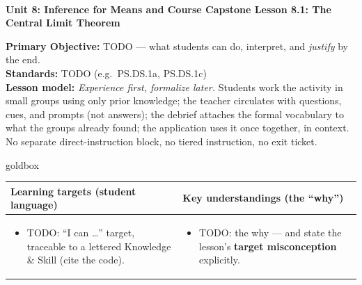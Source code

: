 \documentclass[10pt]{article}
\newcommand{\UnitNumberName}{Unit 8: Inference for Means and Course Capstone \quad}
\newcommand{\LessonNumberName}{Lesson 8.1: The Central Limit Theorem}
\begin{document}
\begin{center}
    {\Large\bfseries \CourseName \\
    {\small\bfseries \UnitNumberName \LessonNumberName}}
\end{center}

\begin{tcolorbox}[colback=frost, colframe=cerulean, boxrule=0.9pt, arc=2mm,
    left=2mm, right=2mm, top=1.5mm, bottom=1.5mm]
    \textbf{Primary Objective:} TODO --- what students can do, interpret, and \emph{justify}
    by the end.
    \\[2pt]
    \textbf{Standards:} TODO (e.g.\ PS.DS.1a, PS.DS.1c)
    \\[2pt]
    \textbf{Lesson model:} \emph{Experience first, formalize later.} Students work the activity
    in small groups using only prior knowledge; the teacher circulates with questions, cues, and
    prompts (not answers); the debrief attaches the formal vocabulary to what the groups already
    found; the application uses it once together, in context. No separate direct-instruction
    block, no tiered instruction, no exit ticket.
\end{tcolorbox}

\renewcommand{\arraystretch}{1.4}
\begin{skillbox}{goldbox}
\begin{tabularx}{\linewidth}{@{}X|X@{}}
\textbf{Learning targets (student language)} & \textbf{Key understandings (the ``why'')} \\[2pt]
\hline
\vspace{-6pt}
\begin{itemize}[leftmargin=1.1em, nosep, after=\vspace{2pt}]
  \item TODO: ``I can \dots'' target, traceable to a lettered Knowledge \& Skill (cite the code).
\end{itemize}
&
\vspace{-6pt}
\begin{itemize}[leftmargin=1.1em, nosep, after=\vspace{2pt}]
  \item TODO: the why --- and state the lesson's \textbf{target misconception} explicitly.
\end{itemize}
\end{tabularx}
\end{skillbox}
\end{document}
